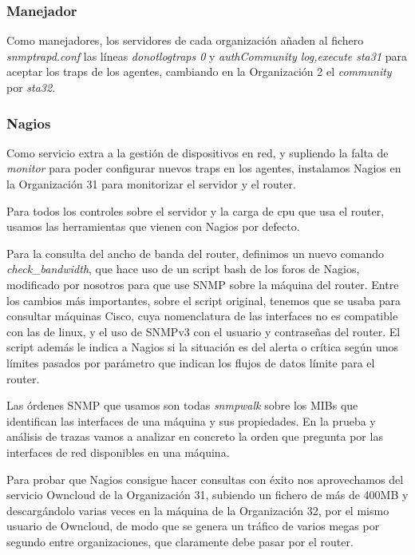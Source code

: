 \documentclass[]{article}
\begin{document}
\subsubsection{Manejador}

Como manejadores, los servidores de cada organización añaden al fichero \textit{snmptrapd.conf} las líneas \textit{donotlogtraps 0} y	\textit{authCommunity log,execute sta31} para aceptar los traps de los agentes, cambiando en la Organización 2 el \textit{community} por \textit{sta32}.



\subsubsection{Nagios}

Como servicio extra a la gestión de dispositivos en red, y supliendo la falta de \textit{monitor} para poder configurar nuevos traps en los agentes, instalamos Nagios en la Organización 31 para monitorizar el servidor y el router.

Para todos los controles sobre el servidor y la carga de cpu que usa el router, usamos las herramientas que vienen con Nagios por defecto.

Para la consulta del ancho de banda del router, definimos un nuevo comando \textit{check\_bandwidth}, que hace uso de un script bash de los foros de Nagios, modificado por nosotros para que use SNMP sobre la máquina del router. Entre los cambios más importantes, sobre el script original, tenemos que se usaba para consultar máquinas Cisco, cuya nomenclatura de las interfaces no es compatible con las de linux, y el uso de SNMPv3 con el usuario y contraseñas del router. El script además le indica a Nagios si la situación es del alerta o crítica según unos límites pasados por parámetro que indican los flujos de datos límite para el router.

Las órdenes SNMP que usamos son todas \textit{snmpwalk} sobre los MIBs que identifican las interfaces de una máquina y sus propiedades. En la prueba y análisis de trazas vamos a analizar en concreto la orden que pregunta por las interfaces de red disponibles en una máquina.



Para probar que Nagios consigue hacer consultas con éxito nos aprovechamos del servicio Owncloud de la Organización 31, subiendo un fichero de más de 400MB y descargándolo varias veces en la máquina de la Organización 32, por el mismo usuario de Owncloud, de modo que se genera un tráfico de varios megas por segundo entre organizaciones, que claramente debe pasar por el router.
\end{document}
